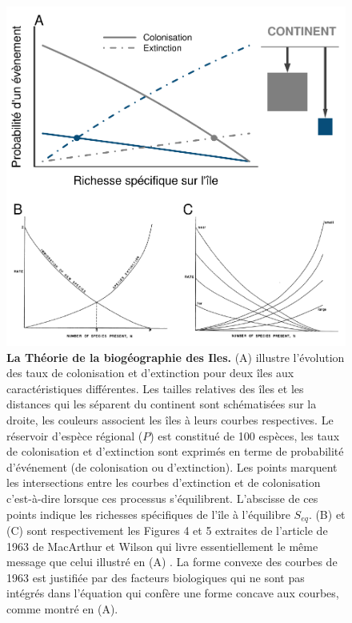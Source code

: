 \begin{figure}[htbp]
\centering
\includegraphics{fig/fig1.pdf}
\caption[La Théorie de la biogéographie des Iles]{\textbf{La Théorie de la biogéographie des Iles.} (A) illustre
l'évolution des taux de colonisation et d'extinction pour deux îles aux
caractéristiques différentes. Les tailles relatives des îles et les
distances qui les séparent du continent sont schématisées sur la droite,
les couleurs associent les îles à leurs courbes respectives. Le
réservoir d'espèce régional (\(P\)) est constitué de 100 espèces, les
taux de colonisation et d'extinction sont exprimés en terme de
probabilité d'événement (de colonisation ou d'extinction). Les points
marquent les intersections entre les courbes d'extinction et de
colonisation c'est-à-dire lorsque ces processus s'équilibrent.
L'abscisse de ces points indique les richesses spécifiques de l'île à
l'équilibre \(S_{eq}\). (B) et (C) sont respectivement les Figures 4 et
5 extraites de l'article de 1963 de MacArthur et Wilson qui livre
essentiellement le même message que celui illustré en (A)
\citep{MacArthur1963}. La forme convexe des courbes de 1963 est
justifiée par des facteurs biologiques qui ne sont pas intégrés dans
l'équation \label{eqMW} qui confère une forme concave aux courbes, comme
montré en (A).\label{fig:figMW}}
\end{figure}

